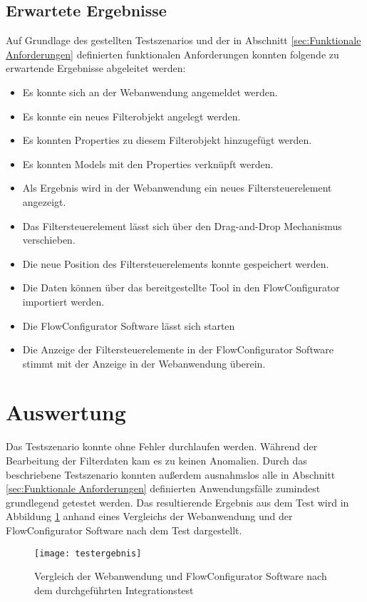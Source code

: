 \subsection{Erwartete Ergebnisse}

Auf Grundlage des gestellten Testszenarios und der in Abschnitt \ref{sec:Funktionale Anforderungen} definierten funktionalen Anforderungen konnten folgende zu erwartende Ergebnisse abgeleitet werden:

\begin{itemize}
\item Es konnte sich an der Webanwendung angemeldet werden.
\item Es konnte ein neues Filterobjekt angelegt werden.
\item Es konnten Properties zu diesem Filterobjekt hinzugefügt werden.
\item Es konnten Models mit den Properties verknüpft werden.
\item Als Ergebnis wird in der Webanwendung ein neues Filtersteuerelement angezeigt.
\item Das Filtersteuerelement lässt sich über den Drag-and-Drop Mechanismus verschieben.
\item Die neue Position des Filtersteuerelements konnte gespeichert werden.
\item Die Daten können über das bereitgestellte Tool in den FlowConfigurator importiert werden.
\item Die FlowConfigurator Software lässt sich starten
\item Die Anzeige der Filtersteuerelemente in der FlowConfigurator Software stimmt mit der Anzeige in der Webanwendung überein.
\end{itemize}

\section{Auswertung}

Das Testszenario konnte ohne Fehler durchlaufen werden. Während der Bearbeitung der Filterdaten kam es zu keinen Anomalien. Durch das beschriebene Testszenario konnten außerdem ausnahmslos alle in Abschnitt \ref{sec:Funktionale Anforderungen} definierten Anwendungsfälle zumindest grundlegend getestet werden. Das resultierende Ergebnis aus dem Test wird in Abbildung \ref{fig:test} anhand eines Vergleichs der Webanwendung und der FlowConfigurator Software nach dem Test dargestellt.

\begin{figure}[H]
\centering
\texttt{[image: testergebnis]} %
\caption{Vergleich der Webanwendung und FlowConfigurator Software nach dem durchgeführten Integrationstest}
\label{fig:test}
\end{figure}

